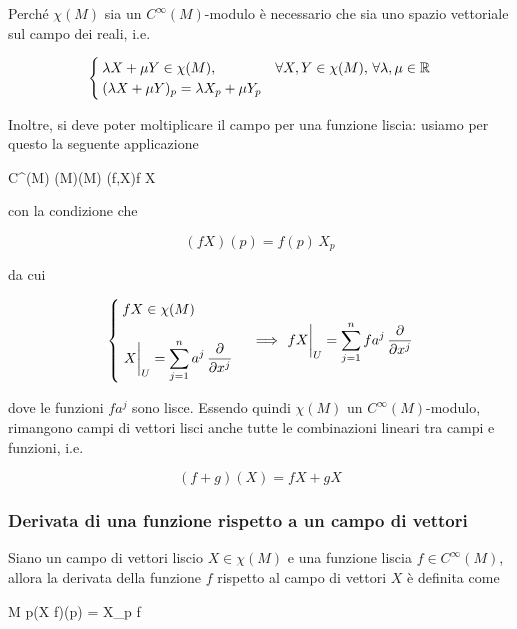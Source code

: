 Perché $ \chi(M) $ sia un $ C^{\infty}(M) $-modulo è necessario che sia uno spazio vettoriale sul campo dei reali, i.e.

\begin{equation}
	\begin{cases}
		\lambda X + \mu Y \in \chi(M), & \forall X,Y \in \chi(M), \, \forall \lambda,\mu \in \mathbb{R}\\
		(\lambda X + \mu Y)_{p} = \lambda X_{p} + \mu Y_{p}
	\end{cases}
\end{equation}

Inoltre, si deve poter moltiplicare il campo per una funzione liscia: usiamo per questo la seguente applicazione

	{C^{\infty}(M) \times \chi(M)}{\chi(M)}
	{(f,X)}{f X}

con la condizione che

\begin{equation}
	(f X)(p) = f(p) \, X_{p}
\end{equation}

da cui

\begin{equation}
	\begin{cases}
		f X \in \chi(M) \\\\
		\displaystyle \eval{X}_{U} = \sum_{j=1}^{n} a^{j} \, \pdv{x^{j}}
	\end{cases} %
	\implies %
	\eval{f X}_{U} = \sum_{j=1}^{n} f a^{j} \, \pdv{x^{j}}
\end{equation}

dove le funzioni $ f a^{j} $ sono lisce. Essendo quindi $ \chi(M) $ un $ C^{\infty}(M) $-modulo, rimangono campi di vettori lisci anche tutte le combinazioni lineari tra campi e funzioni, i.e.

\begin{equation}
	(f+g)(X) = f X + g X
\end{equation}

\subsubsection{Derivata di una funzione rispetto a un campo di vettori}

Siano un campo di vettori liscio $ X \in \chi(M) $ e una funzione liscia $ f \in C^{\infty}(M) $, allora la derivata della funzione $ f $ rispetto al campo di vettori $ X $ è definita come

	{M}{\R}
	{p}{(X f)(p) = X_{p} f}

